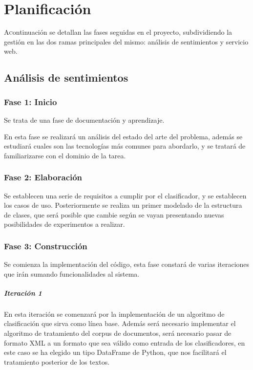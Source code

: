 \chapter{Planificación}\label{sec:plani}

\lettrine{A} continuación se detallan las fases seguidas en el proyecto, subdividiendo la gestión en las dos ramas principales del mismo: análisis de sentimientos y servicio web.

\section{Análisis de sentimientos}

\subsection{Fase 1: Inicio}

Se trata de una fase de documentación y aprendizaje.

En esta fase se realizará un análisis del estado del arte del problema, además se estudiará cuales son las tecnologías más comunes para abordarlo, y se tratará de familiarizarse con el dominio de la tarea.

\subsection{Fase 2: Elaboración}

Se establecen una serie de requisitos a cumplir por el clasificador, y se establecen los casos de uso. Posteriormente se realiza un primer modelado de la estructura de clases, que será posible que cambie según se vayan presentando nuevas posibilidades de experimentos a realizar.

\subsection{Fase 3: Construcción}

Se comienza la implementación del código, esta fase constará de varias iteraciones que irán sumando funcionalidades al sistema.

\paragraph{Iteración 1} En esta iteración se comenzará por la implementación de un algoritmo de clasificación que sirva como línea base. Además será necesario implementar el algoritmo de tratamiento del corpus de documentos, será necesario pasar de formato XML a un formato que sea válido como entrada de los clasificadores, en este caso se ha elegido un tipo DataFrame de Python, que nos facilitará el tratamiento posterior de los textos.

